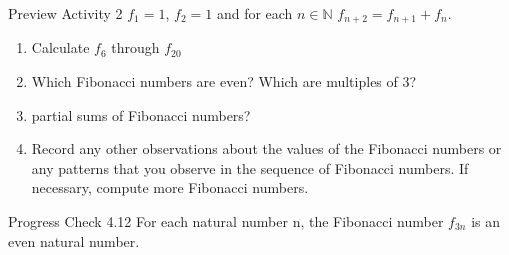 \documentclass{beamer}
\begin{document}
\begin{frame}{Preview Activity 2}
    $f_1 = 1$, $f_2 = 1$ and for each $n \in \mathbb{N}$ $f_{n+2} = f_{n+1} + f_n$.
    \begin{enumerate}
        \item Calculate $f_6$ through $f_{20}$ \pause
        \item Which Fibonacci numbers are even?  Which are multiples of 3?
        \item partial sums of Fibonacci numbers?
        \item Record any other observations about the values of the Fibonacci numbers
or any patterns that you observe in the sequence of Fibonacci numbers. If
necessary, compute more Fibonacci numbers.
    \end{enumerate}
\end{frame}

\begin{frame}{Progress Check 4.12}
For each natural number n, the Fibonacci number $f_{3n}$ is an
even natural number.    
\end{frame}
\end{document}
